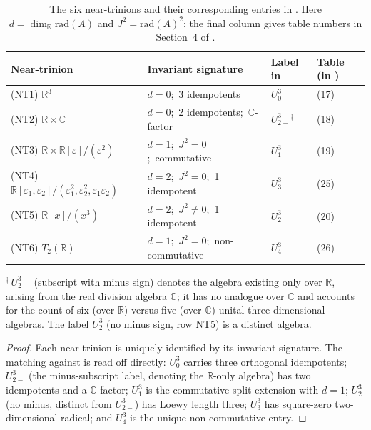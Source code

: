 \documentclass{amsart}
\theoremstyle{plain}
\theoremstyle{definition}
\theoremstyle{remark}
\newcommand{\RR}{\mathbb{R}}
\newcommand{\CC}{\mathbb{C}}
\newcommand{\Jac}{\mathrm{rad}}
\begin{document}
\begin{table}[h]
\caption{The six near-trinions and their corresponding entries in
\cite{Kobayashi2021}. Here $d = \dim_\RR \Jac(A)$ and $J^2 = \Jac(A)^2$;
the final column gives table numbers in Section~4 of \cite{Kobayashi2021}.}
\label{tab:kst}
\renewcommand{\arraystretch}{1.35}
\begin{tabular}{llll}
  \toprule
  Near-trinion & Invariant signature & Label in \cite{Kobayashi2021} & Table (in \cite{Kobayashi2021}) \\
  \midrule
  \textup{(NT1)} $\RR^3$
    & $d=0$;\ 3 idempotents
    & $U^3_0$ & (17) \\
  \textup{(NT2)} $\RR \times \CC$
    & $d=0$;\ 2 idempotents;\ $\CC$-factor
    & $U^3_{2-}{}^{\dagger}$ & (18) \\
  \textup{(NT3)} $\RR \times \RR[\varepsilon]/(\varepsilon^2)$
    & $d=1$;\ $J^2=0$;\ commutative
    & $U^3_1$ & (19) \\
  \textup{(NT4)} $\RR[\varepsilon_1,\varepsilon_2]/(\varepsilon^2_1,\varepsilon^2_2,\varepsilon_1\varepsilon_2)$
    & $d=2$;\ $J^2=0$;\ 1 idempotent
    & $U^3_3$ & (25) \\
  \textup{(NT5)} $\RR[x]/(x^3)$
    & $d=2$;\ $J^2\neq 0$;\ 1 idempotent
    & $U^3_2$ & (20) \\
  \textup{(NT6)} $T_2(\RR)$
    & $d=1$;\ $J^2=0$;\ non-commutative
    & $U^3_4$ & (26) \\
  \bottomrule
\end{tabular}
\smallskip

\noindent\footnotesize{$^\dagger\,U^3_{2-}$ (subscript with minus sign)
denotes the algebra existing only over $\RR$, arising from the real division
algebra $\CC$; it has no analogue over $\CC$ and accounts for the count of
six (over $\RR$) versus five (over $\CC$) unital three-dimensional algebras.
The label $U^3_2$ (no minus sign, row NT5) is a distinct algebra.}
\end{table}

\begin{proof}
  Each near-trinion is uniquely identified by its invariant signature.
  The matching against \cite{Kobayashi2021} is read off directly:
  $U^3_0$ carries three orthogonal idempotents; $U^3_{2-}$ (the minus-subscript
  label, denoting the $\RR$-only algebra) has two idempotents and a $\CC$-factor;
  $U^3_1$ is the commutative split extension with $d=1$;
  $U^3_2$ (no minus, distinct from $U^3_{2-}$) has Loewy length three;
  $U^3_3$ has square-zero two-dimensional radical; and $U^3_4$ is the unique
  non-commutative entry.
\end{proof}
\end{document}
